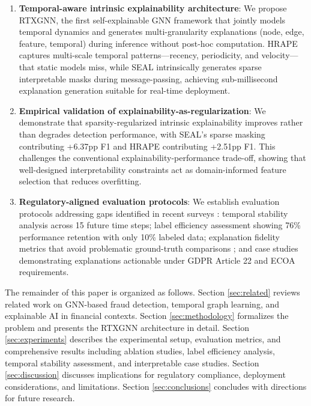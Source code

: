 \begin{enumerate}
    \item \textbf{Temporal-aware intrinsic explainability architecture}: We propose RTXGNN, the first self-explainable GNN framework that jointly models temporal dynamics and generates multi-granularity explanations (node, edge, feature, temporal) during inference without post-hoc computation. HRAPE captures multi-scale temporal patterns—recency, periodicity, and velocity—that static models miss, while SEAL intrinsically generates sparse interpretable masks during message-passing, achieving sub-millisecond explanation generation suitable for real-time deployment.

    \item \textbf{Empirical validation of explainability-as-regularization}: We demonstrate that sparsity-regularized intrinsic explainability improves rather than degrades detection performance, with SEAL's sparse masking contributing +6.37pp F1 and HRAPE contributing +2.51pp F1. This challenges the conventional explainability-performance trade-off, showing that well-designed interpretability constraints act as domain-informed feature selection that reduces overfitting.

    \item \textbf{Regulatory-aligned evaluation protocols}: We establish evaluation protocols addressing gaps identified in recent surveys \citep{yuan2023explainability_survey, cherif2024survey, nandan2025graphxai}: temporal stability analysis across 15 future time steps; label efficiency assessment showing 76\% performance retention with only 10\% labeled data; explanation fidelity metrics that avoid problematic ground-truth comparisons \citep{faber2021groundtruth}; and case studies demonstrating explanations actionable under GDPR Article 22 and ECOA \citep{ecoa1974} requirements.
\end{enumerate}

The remainder of this paper is organized as follows. Section \ref{sec:related} reviews related work on GNN-based fraud detection, temporal graph learning, and explainable AI in financial contexts. Section \ref{sec:methodology} formalizes the problem and presents the RTXGNN architecture in detail. Section \ref{sec:experiments} describes the experimental setup, evaluation metrics, and comprehensive results including ablation studies, label efficiency analysis, temporal stability assessment, and interpretable case studies. Section \ref{sec:discussion} discusses implications for regulatory compliance, deployment considerations, and limitations. Section \ref{sec:conclusions} concludes with directions for future research.